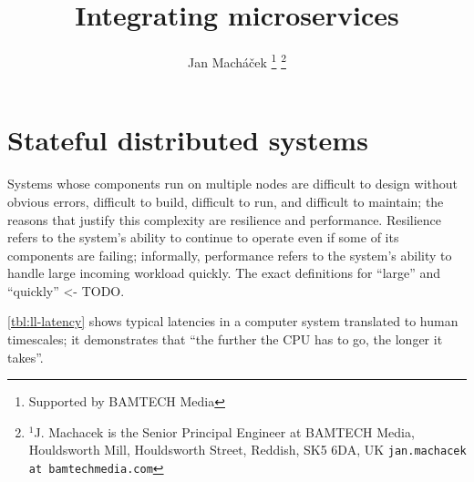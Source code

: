 



\title{Integrating microservices}

\author{Jan Mach{\'a}\v{c}ek%
\thanks{Supported by BAMTECH Media}%
\thanks{$^{1}$J. Machacek is the Senior Principal Engineer at BAMTECH Media, Houldsworth Mill, Houldsworth Street, Reddish, SK5 6DA, UK {\tt\small jan.machacek at bamtechmedia.com}}%
}




\section{Stateful distributed systems}
Systems whose components run on multiple nodes are difficult to design without obvious errors, difficult to build, difficult to run, and difficult to maintain; the reasons that justify this complexity are resilience and performance. Resilience refers to the system's ability to continue to operate even if some of its components are failing; informally, performance refers to the system's ability to handle large incoming workload quickly. The exact definitions for ``large'' and ``quickly'' <- TODO.

\autoref{tbl:ll-latency}\cite{fommil-netlib} shows typical latencies in a computer system translated to human timescales; it demonstrates that ``the further the CPU has to go, the longer it takes''.

